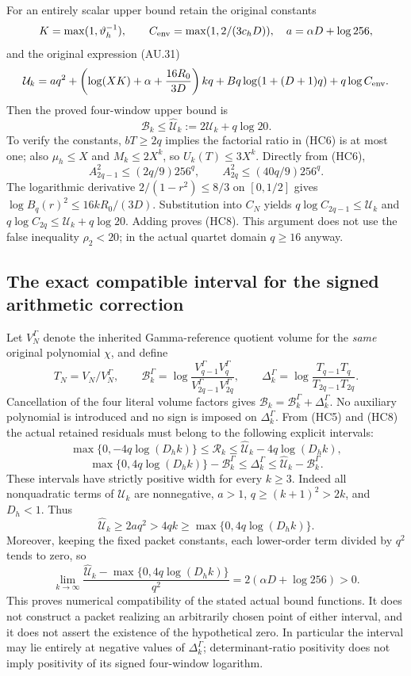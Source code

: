 For an entirely scalar upper bound retain the original constants
\[
 K=\max(1,\vartheta_h^{-1}),\qquad
 C_{\rm env}=\max(1,2/(3c_hD)),\quad a=\alpha D+\log256,
\]
and the original expression (AU.31)
\[
 \mathcal U_k=a q^2+
 \left(\log(XK)+\alpha+\frac{16R_0}{3D}\right)kq
 +Bq\log(1+(D+1)q)+q\log C_{\rm env}.
\]
Then the proved four-window upper bound is
\[
 \boxed{\mathcal B_k\leq\widehat{\mathcal U}_k
 :=2\mathcal U_k+q\log20.}\tag{HC8}
\]
To verify the constants, $bT\geq2q$ implies the factorial ratio in
(HC6) is at most one; also $\mu_h\leq X$ and $M_k\leq2X^k$, so
$U_k(T)\leq3X^k$.  Directly from (HC6),
\[
 A_{2q-1}^2\leq(2q/9)256^q,\qquad
 A_{2q}^2\leq(40q/9)256^q.
\]
The logarithmic derivative $2/(1-r^2)\leq8/3$ on $[0,1/2]$ gives
$\log B_q(r)^2\leq16kR_0/(3D)$.  Substitution into $C_N$ yields
$q\log C_{2q-1}\leq\mathcal U_k$ and
$q\log C_{2q}\leq\mathcal U_k+q\log20$.
Adding proves (HC8).  This argument does not use the false inequality
$\rho_2<20$; in the actual quartet domain $q\geq16$ anyway.

\subsection{The exact compatible interval for the signed arithmetic correction}

Let $V_N^\Gamma$ denote the inherited Gamma-reference quotient volume
for the \emph{same} original polynomial $\chi$, and define
\[
 T_N=V_N/V_N^\Gamma,\qquad
 \mathcal B_k^\Gamma=\log\frac{V_{q-1}^\Gamma V_q^\Gamma}
 {V_{2q-1}^\Gamma V_{2q}^\Gamma},\qquad
 \Delta_k^\Gamma=\log\frac{T_{q-1}T_q}{T_{2q-1}T_{2q}}.
\]
Cancellation of the four literal volume factors gives
$\mathcal B_k=\mathcal B_k^\Gamma+\Delta_k^\Gamma$.
No auxiliary polynomial is introduced and no sign is imposed on
$\Delta_k^\Gamma$.  From (HC5) and (HC8) the actual retained residuals
must belong to the following explicit intervals:
\[
 \boxed{
 \max\{0,-4q\log(D_hk)\}\leq\mathcal R_k
 \leq\widehat{\mathcal U}_k-4q\log(D_hk),}
 \tag{HC9}
\]
\[
 \boxed{
 \max\{0,4q\log(D_hk)\}-\mathcal B_k^\Gamma
 \leq\Delta_k^\Gamma
 \leq\widehat{\mathcal U}_k-\mathcal B_k^\Gamma.}
 \tag{HC10}
\]
These intervals have strictly positive width for every $k\geq3$.
Indeed all nonquadratic terms of $\mathcal U_k$ are nonnegative,
$a>1$, $q\geq(k+1)^2>2k$, and $D_h<1$.  Thus
\[
 \widehat{\mathcal U}_k\geq2a q^2
 >4qk\geq\max\{0,4q\log(D_hk)\}.
\]
Moreover, keeping the fixed packet constants, each lower-order term
divided by $q^2$ tends to zero, so
\[
 \lim_{k\to\infty}
 \frac{\widehat{\mathcal U}_k-\max\{0,4q\log(D_hk)\}}{q^2}
 =2(\alpha D+\log256)>0.\tag{HC11}
\]
This proves numerical compatibility of the stated actual bound
functions.  It does not construct a packet realizing an arbitrarily
chosen point of either interval, and it does not assert the existence
of the hypothetical zero.  In particular the interval may lie entirely
at negative values of $\Delta_k^\Gamma$; determinant-ratio positivity
does not imply positivity of its signed four-window logarithm.

